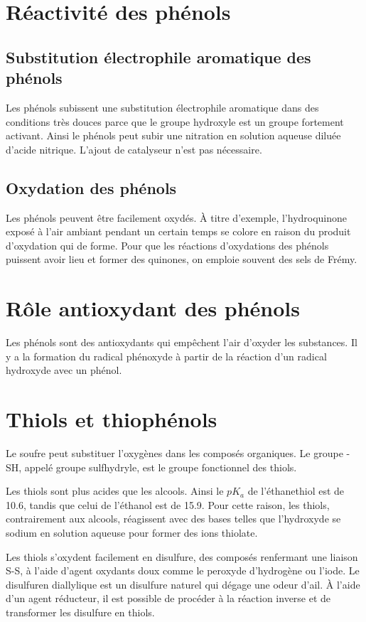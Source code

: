 \section{Réactivité des phénols}

\subsection{Substitution électrophile aromatique des phénols}
Les phénols subissent une substitution électrophile aromatique dans des conditions très douces parce que le groupe hydroxyle est un groupe fortement activant.
Ainsi le phénols peut subir une nitration en solution aqueuse diluée d'acide nitrique.
L'ajout de catalyseur n'est pas nécessaire.


\subsection{Oxydation des phénols}
Les phénols peuvent être facilement oxydés.
\`A titre d'exemple, l'hydroquinone exposé à l'air ambiant pendant un certain temps se colore en raison du produit d'oxydation qui de forme.
Pour que les réactions d'oxydations des phénols puissent avoir lieu et former des quinones, on emploie souvent des sels de Frémy.


\section{Rôle antioxydant des phénols}
Les phénols sont des antioxydants qui empêchent l'air d'oxyder les substances.
Il y a la formation du radical phénoxyde à partir de la réaction d'un radical hydroxyde avec un phénol.
\section{Thiols et thiophénols}
Le soufre peut substituer l'oxygènes dans les composés organiques.
Le groupe -SH, appelé groupe sulfhydryle, est le groupe fonctionnel des thiols.


Les thiols sont plus acides que les alcools.
Ainsi le $pK_a$ de l'éthanethiol est de 10.6, tandis que celui de l'éthanol est de 15.9.
Pour cette raison, les thiols, contrairement aux alcools, réagissent avec des bases telles que l'hydroxyde se sodium en solution aqueuse pour former des ions thiolate.

Les thiols s'oxydent facilement en disulfure, des composés renfermant une liaison S-S, à l'aide d'agent oxydants doux comme le peroxyde d'hydrogène ou l'iode.
Le disulfuren diallylique est un disulfure naturel qui dégage une odeur d'ail.
\`A l'aide d'un agent réducteur, il est possible de procéder à la réaction inverse et de transformer les disulfure en thiols.


